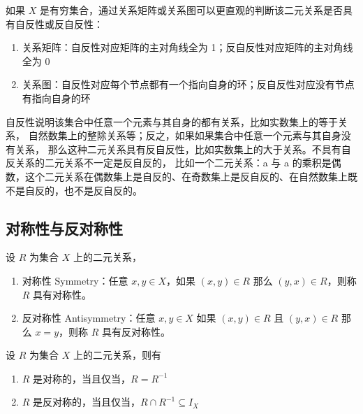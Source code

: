 \begin{note}
    如果 $ X $ 是有穷集合，通过关系矩阵或关系图可以更直观的判断该二元关系是否具有自反性或反自反性：
    \begin{enumerate}
        \item 关系矩阵：自反性对应矩阵的主对角线全为 1；反自反性对应矩阵的主对角线全为 0
        \item 关系图：自反性对应每个节点都有一个指向自身的环；反自反性对应没有节点有指向自身的环
    \end{enumerate}
    自反性说明该集合中任意一个元素与其自身的都有关系，比如实数集上的等于关系，
    自然数集上的整除关系等；反之，如果如果集合中任意一个元素与其自身没有关系，
    那么这种二元关系具有反自反性，比如实数集上的大于关系。不具有自反关系的二元关系不一定是反自反的，
    比如一个二元关系：a 与 a 的乘积是偶数，这个二元关系在偶数集上是自反的、在奇数集上是反自反的、在自然数集上既不是自反的，也不是反自反的。
\end{note}
\vspace{1em}

\subsection{对称性与反对称性}
\begin{definition}
    设 $ R $ 为集合 $ X $ 上的二元关系，
    \begin{enumerate}
        \item 对称性 Symmetry：任意 $ x,y\in X $，如果 $ (x,y)\in R $ 那么 $ (y,x)\in R $，则称 $ R $ 具有对称性。
        \item 反对称性 Antisymmetry：任意 $ x,y\in X $ 如果 $ (x,y)\in R $ 且 $ (y,x)\in R $ 那么 $ x=y $，则称 $ R $ 具有反对称性。
    \end{enumerate}
\end{definition}

\begin{proposition}
    设 $ R $ 为集合 $ X $ 上的二元关系，则有
    \begin{enumerate}
        \item $ R $ 是对称的，当且仅当，$ R = R^{-1} $
        \item $ R $ 是反对称的，当且仅当，$ R \cap R^{-1} \subseteq I_X $
    \end{enumerate}
\end{proposition}

